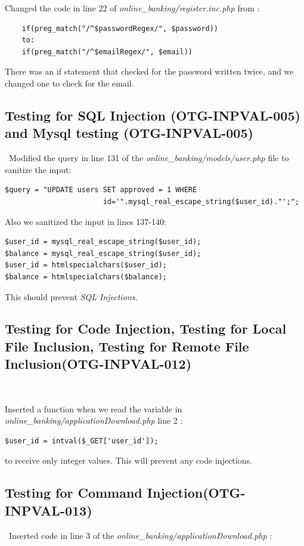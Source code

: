 \documentclass[headsepline,footsepline,footinclude=false,oneside,fontsize=11pt,paper=a4,listof=totoc,bibliography=totoc]{scrbook} %
\begin{document}
Changed the code in line 22 of \textit{online\_banking/register.inc.php} from :

\begin{lstlisting} 
    if(preg_match("/^$passwordRegex/", $password))
    to:
    if(preg_match("/^$emailRegex/", $email))
\end{lstlisting}
There was an if statement that checked for the password written twice, and we changed one to check for the email.\\



\subsection{Testing for SQL Injection (OTG-INPVAL-005) and Mysql testing (OTG-INPVAL-005)}\
Modified the query in line 131 of the \textit{online\_banking/models/user.php} file to sanitize the input: 
  
\begin{lstlisting} 
$query = "UPDATE users SET approved = 1 WHERE 
                       id='".mysql_real_escape_string($user_id)."';";
\end{lstlisting}
Also we sanitized the input in lines 137-140:

\begin{lstlisting}
$user_id = mysql_real_escape_string($user_id); 
$balance = mysql_real_escape_string($user_id);
$user_id = htmlspecialchars($user_id);
$balance = htmlspecialchars($balance);
\end{lstlisting}

This should prevent \textit{SQL Injections}.\\

\pagebreak
\subsection{Testing for Code Injection, Testing for Local File Inclusion, Testing for Remote File Inclusion(OTG-INPVAL-012)}\


Inserted a function when we read the variable in \textit{online\_banking/applicationDownload.php} line 2 :  

\begin{lstlisting} 
$user_id = intval($_GET['user_id']);
\end{lstlisting} 
to receive only integer values.
This will prevent any code injections.\\

\subsection{Testing for Command Injection(OTG-INPVAL-013)}\
Inserted code in line 3 of the \textit{online\_banking/applicationDownload.php} : 
\end{document}
